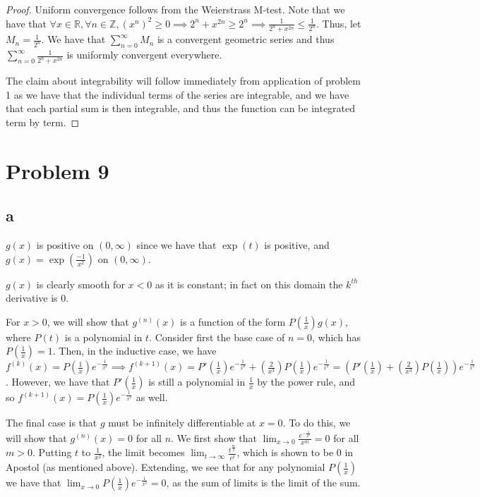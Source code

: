 \documentclass[12pt,letterpaper]{article}
\theoremstyle{definition}
\newcommand{\R}{\mathbb{R}}
\newcommand{\Z}{\mathbb{Z}}
\begin{document}
\begin{proof}
  Uniform convergence follows from the Weierstrass M-test. Note that we have that
  $\forall x \in \R, \forall n \in \Z, (x^n)^{2} \geq 0 \implies 2^n + x^{2n} \geq 2^n
  \implies \frac{1}{2^n + x^{2n}} \leq \frac{1}{2^n}$. Thus, let $M_n =
  \frac{1}{2^n}$. We have that $\sum_{n=0}^\infty M_n$ is a convergent geometric
  series and thus $\sum_{n=0}^\infty \frac{1}{2^n + x^{2n}}$ is uniformly
  convergent everywhere.

  The claim about integrability will follow immediately from application of
  problem 1 as we have that the individual terms of the series are integrable,
  and we have that each partial sum is then integrable, and thus the function
  can be integrated term by term.
\end{proof}

\section*{Problem 9}

\subsection*{a}

$g(x)$ is positive on $(0, \infty)$ since we have that $\exp(t)$ is positive,
and $g(x) = \exp(\frac{-1}{x^2})$ on $(0, \infty)$.

$g(x)$ is clearly smooth for $x < 0$ as it is constant; in fact on this domain the $k^{th}$
derivative is 0.

For $x > 0$, we will show that $g^{(n)}(x)$ is a function of the form
$P(\frac{1}{x})g(x)$, where $P(t)$ is a polynomial in $t$. Consider first the
base case of $n = 0$, which has $P(\frac{1}{x}) = 1$. Then, in the inductive
case, we have $f^{(k)}(x) = P(\frac{1}{x})e^{-\frac{1}{x^2}} \implies
f^{(k+1)}(x) = P'(\frac{1}{x})e^{-\frac{1}{x^2}} + \left( \frac{2}{x^3}
\right)P(\frac{1}{x})e^{-\frac{1}{x^2}} = (P'(\frac{1}{x}) + \left(
  \frac{2}{x^3} \right)P(\frac{1}{x}))e^{-\frac{1}{x^2}}$. However, we have that
$P'(\frac{1}{x})$ is still a polynomial in $\frac{1}{x}$ by the power rule, and
so $f^{(k+1)}(x) = P(\frac{1}{x})e^{-\frac{1}{x^2}}$ as well.

The final case is that $g$ must be infinitely differentiable at $x = 0$. To do this, we
will show that $g^{(n)}(x) = 0$ for all $n$. We first show that
$\lim_{x\rightarrow 0}\frac{e^{-\frac{1}{x^2}}}{x^m} = 0$ for all $m > 0$.
Putting $t$ to $\frac{1}{x^2}$, the limit becomes $\lim_{t\rightarrow
  \infty}\frac{t^{\frac{m}{2}}}{e^t}$, which is shown to be 0 in Apostol (as
mentioned above). Extending, we see that for any polynomial $P(\frac{1}{x})$ we
have that $\lim_{x\rightarrow 0}P(\frac{1}{x})e^{-\frac{1}{x^2}} = 0$, as the
sum of limits is the limit of the sum.
\end{document}
